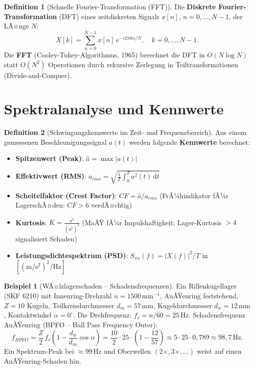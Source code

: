 ﻿\documentclass[a4paper,12pt]{report}
\theoremstyle{definition}
\newtheorem{definition}{Definition}
\newtheorem{beispiel}{Beispiel}
\begin{document}
\begin{definition}[Schnelle Fourier-Transformation (FFT)]
Die \textbf{Diskrete Fourier-Transformation} (DFT) eines zeitdiskreten Signals
$x[n]$, $n = 0, \ldots, N-1$, der LÃ¤nge $N$:
\[
  X[k] = \sum_{n=0}^{N-1} x[n]\,e^{-i 2\pi kn/N}, \quad k = 0, \ldots, N-1.
\]
Die \textbf{FFT} (Cooley-Tukey-Algorithmus, 1965) berechnet die DFT
in $O(N\log N)$ statt $O(N^2)$ Operationen durch rekursive Zerlegung
in Teiltransformationen (Divide-and-Conquer).
\end{definition}

\section{Spektralanalyse und Kennwerte}

\begin{definition}[Schwingungskennwerte im Zeit- und Frequenzbereich]
Aus einem gemessenen Beschleunigungssignal $a(t)$ werden folgende
\textbf{Kennwerte} berechnet:
\begin{itemize}
    \item[-] \textbf{Spitzenwert (Peak)}: $\hat{a} = \max|a(t)|$
    \item[-] \textbf{Effektivwert (RMS)}: $a_{rms} = \sqrt{\frac{1}{T}\int_0^T a^2(t)\,\mathrm{d}t}$
    \item[-] \textbf{Scheitelfaktor (Crest Factor)}: $CF = \hat{a}/a_{rms}$
          (FrÃ¼hindikator fÃ¼r LagerschÃ¤den: $CF > 6$ verdÃ¤chtig)
    \item[-] \textbf{Kurtosis}: $K = \frac{\overline{a^4}}{(\overline{a^2})^2}$
          (MaÃŸ fÃ¼r Impulshaftigkeit; Lager-Kurtosis $> 4$ signalisiert Schaden)
    \item[-] \textbf{Leistungsdichtespektrum (PSD)}: $S_{xx}(f) = |X(f)|^2/T$
          in $[\mathrm{(m/s^2)^2/Hz}]$
\end{itemize}
\end{definition}

\begin{beispiel}[WÃ¤lzlagerschaden -- Schadensfrequenzen]
Ein Rillenkugellager (SKF 6210) mit Innenring-Drehzahl $n = 1500\,\mathrm{min^{-1}}$,
AuÃŸenring feststehend, $Z = 10$ Kugeln, Teilkreisdurchmesser $d_m = 57\,\mathrm{mm}$,
Kugeldurchmesser $d_w = 12\,\mathrm{mm}$, Kontaktwinkel $\alpha = 0^\circ$.
Die Drehfrequenz: $f_r = n/60 = 25\,\mathrm{Hz}$.
Schadensfrequenz AuÃŸenring (BPFO -- Ball Pass Frequency Outer):
\[
  f_{BPFO} = \frac{Z}{2}\,f_r\left(1 - \frac{d_w}{d_m}\cos\alpha\right)
  = \frac{10}{2}\cdot 25\cdot\left(1 - \frac{12}{57}\right)
  \approx 5\cdot25\cdot0{,}789 \approx 98{,}7\,\mathrm{Hz}.
\]
Ein Spektrum-Peak bei $\approx 99\,\mathrm{Hz}$ und Oberwellen $(2\times, 3\times, \ldots)$
weist auf einen AuÃŸenring-Schaden hin.
\end{beispiel}
\end{document}
